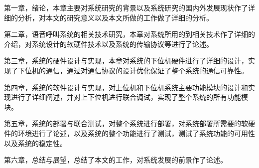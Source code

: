 第一章，绪论，本章主要对系统研究的背景以及系统研究的国内外发展现状作了详细的分析，对本文的研究意义以及本文所做的工作做了详细的分析。

第二章，语音呼叫系统的相关技术研究，本章对系统所用的到相关技术作了详细的介绍，对系统设计的软硬件技术以及系统的传输协议等进行了论述。

第三章，系统的硬件设计与实现，本章对系统的下位机硬件进行了详细的设计，实现了下位机的通信，通过对通信协议的设计优化保证了整个系统的通信可靠性。

第四章，系统的软件设计与实现，对上位机和下位机系统主要功能模块的设计和实现进行了详细阐述，并对上下位机进行联合调试，实现了整个系统的所有功能模块。

第五章，系统的部署与联合测试，对整个系统进行部署，对系统部署所需要的软硬件的环境进行了论述，以及系统的整个功能进行了测试，测试了系统功能的可用性以及系统的稳定性。

第六章，总结与展望，总结了本文的工作，对系统发展的前景作了论述。
